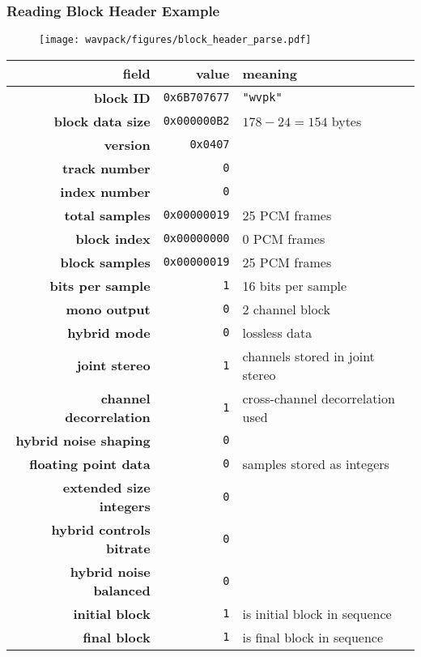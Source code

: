 \clearpage

\subsubsection{Reading Block Header Example}
\begin{figure}[h]
  \texttt{[image: wavpack/figures/block\_header\_parse.pdf]}
\end{figure}

{
  \begin{tabular}{rrl}
    field & value & meaning \\
    \hline
    \textbf{block ID} & \texttt{0x6B707677} & \texttt{"wvpk"} \\
    \textbf{block data size} & \texttt{0x000000B2} & $178 - 24 = 154$ bytes \\
    \textbf{version} & \texttt{0x0407} \\
    \textbf{track number} & \texttt{0} \\
    \textbf{index number} & \texttt{0} \\
    \textbf{total samples} & \texttt{0x00000019} & 25 PCM frames \\
    \textbf{block index} & \texttt{0x00000000} & 0 PCM frames \\
    \textbf{block samples} & \texttt{0x00000019} & 25 PCM frames \\
    \textbf{bits per sample} & \texttt{1} & 16 bits per sample \\
    \textbf{mono output} & \texttt{0} & 2 channel block \\
    \textbf{hybrid mode} & \texttt{0} & lossless data \\
    \textbf{joint stereo} & \texttt{1} & channels stored in joint stereo \\
    \textbf{channel decorrelation} & \texttt{1} & cross-channel decorrelation used \\
    \textbf{hybrid noise shaping} & \texttt{0} \\
    \textbf{floating point data} & \texttt{0} & samples stored as integers \\
    \textbf{extended size integers} & \texttt{0} \\
    \textbf{hybrid controls bitrate} & \texttt{0} \\
    \textbf{hybrid noise balanced} & \texttt{0} \\
    \textbf{initial block} & \texttt{1} & is initial block in sequence \\
    \textbf{final block} & \texttt{1} & is final block in sequence \\

\end{tabular}}

